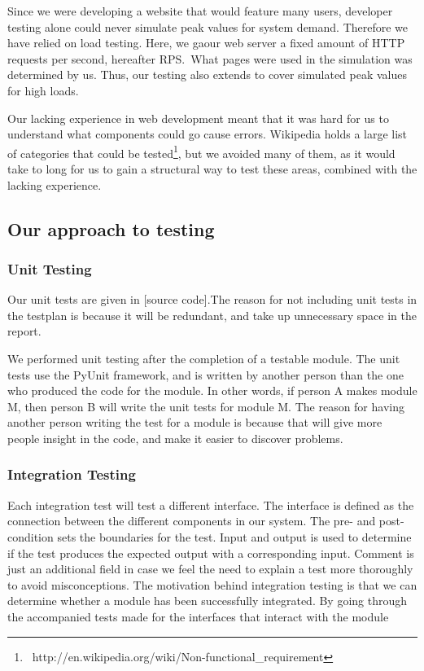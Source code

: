 Since we were developing a website that would feature many users,
developer testing alone could never simulate peak values for system
demand. Therefore we have relied on load testing. Here, we ga\ve our web
server a fixed amount of HTTP requests per second, hereafter RPS.\ What
pages were used in the simulation was determined by us. Thus, our
testing also extends to cover simulated peak values for high loads.




Our lacking experience in web development meant that it was hard for us
to understand what components could go cause errors. Wikipedia holds a
large list of categories that could be
tested\footnote{\ http://en.wikipedia.org/wiki/Non-functional\_requirement},
but we avoided many of them, as it would take to long for us to gain a
structural way to test these areas, combined with the lacking
experience. 

\subsection{Our approach to testing}
\subsubsection{Unit Testing}
Our unit tests are given in [source code].The reason for not including
unit tests in the testplan is because it will be redundant, and take up
unnecessary space in the report.

We performed unit testing after the completion of a testable module. The
unit tests use the PyUnit framework, and is written by another person
than the one who produced the code for the module. In other words, if
person A makes module M, then person B will write the unit tests for
module M. The reason for having another person writing the test for a
module is because that will give more people insight in the code, and
make it easier to discover problems.

\subsubsection{Integration Testing}
Each integration test will test a different interface. The interface is
defined as the connection between the different components in our
system. The pre- and post-condition sets the boundaries for the test.
Input and output is used to determine if the test produces the expected
output with a corresponding input. Comment is just an additional field
in case we feel the need to explain a test more thoroughly to avoid
misconceptions. The motivation behind integration testing is that we
can determine whether a module has been successfully integrated. By
going through the accompanied tests made for the interfaces that
interact with the module


